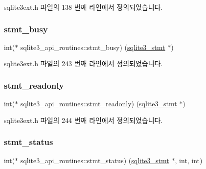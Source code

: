 sqlite3ext.\+h 파일의 138 번째 라인에서 정의되었습니다.

\mbox{\label{structsqlite3__api__routines_a046c107f8b417c85acc32a4d964aa913}} 
\subsubsection{\texorpdfstring{stmt\+\_\+busy}{stmt\_busy}}
{\footnotesize\ttfamily int($\ast$ sqlite3\+\_\+api\+\_\+routines\+::stmt\+\_\+busy) (\hyperlink{sqlite3_8h_af2a033da1327cdd77f0a174a09aedd0c}{sqlite3\+\_\+stmt} $\ast$)}



sqlite3ext.\+h 파일의 243 번째 라인에서 정의되었습니다.

\mbox{\label{structsqlite3__api__routines_a04499bf64d666eb00fb19ae01cdbb8b1}} 
\subsubsection{\texorpdfstring{stmt\+\_\+readonly}{stmt\_readonly}}
{\footnotesize\ttfamily int($\ast$ sqlite3\+\_\+api\+\_\+routines\+::stmt\+\_\+readonly) (\hyperlink{sqlite3_8h_af2a033da1327cdd77f0a174a09aedd0c}{sqlite3\+\_\+stmt} $\ast$)}



sqlite3ext.\+h 파일의 244 번째 라인에서 정의되었습니다.

\mbox{\label{structsqlite3__api__routines_aa9ab187c1c6a398aa67095978485dffe}} 
\subsubsection{\texorpdfstring{stmt\+\_\+status}{stmt\_status}}
{\footnotesize\ttfamily int($\ast$ sqlite3\+\_\+api\+\_\+routines\+::stmt\+\_\+status) (\hyperlink{sqlite3_8h_af2a033da1327cdd77f0a174a09aedd0c}{sqlite3\+\_\+stmt} $\ast$, int, int)}



